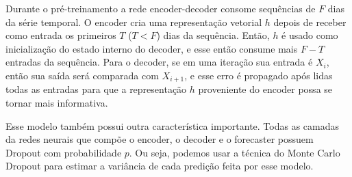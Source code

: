 Durante o pré-treinamento a rede encoder-decoder consome sequências de $F$ dias
da série temporal. O encoder cria uma representação vetorial $h$ depois de
receber como entrada os primeiros $T$ ($T < F$) dias da sequência. Então, $h$ é usado como
inicialização do estado interno do decoder, e esse então consume mais $F - T$
entradas da sequência. Para o decoder, se em uma iteração sua entrada é $X_i$,
então sua saída será comparada com $X_{i+1}$, e esse erro é propagado após lidas
todas as entradas para que a representação $h$ proveniente do encoder possa se
tornar mais informativa.


Esse modelo também possui outra característica importante. Todas as camadas da
redes neurais que compõe o encoder, o decoder e o forecaster possuem
Dropout com probabilidade $p$. Ou seja, podemos usar a técnica do Monte
Carlo Dropout para estimar a variância de cada predição feita por esse modelo. \\










